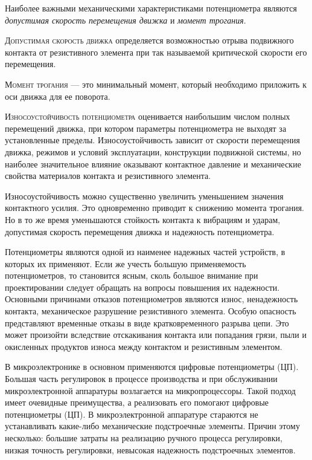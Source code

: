 Наиболее важными механическими характеристиками потенциометра являются \textit{допустимая скорость перемещения движка} и \textit{момент трогания}. 

\textsc{Допустимая скорость движка} определяется возможностью отрыва подвижного контакта от резистивного элемента при так называемой критической скорости его перемещения.

\textsc{Момент трогания} --- это минимальный момент, который необходимо приложить к оси движка для ее поворота. 

\textsc{Износоустойчивость потенциометра} оценивается наибольшим числом полных перемещений движка, при котором параметры потенциометра не выходят за установленные пределы. Износоустойчивость зависит от скорости перемещения движка, режимов и условий эксплуатации, конструкции подвижной системы, но наиболее значительное влияние оказывают контактное давление и механические свойства материалов контакта и резистивного элемента. 

Износоустойчивость можно существенно увеличить уменьшением значения контактного усилия. 
Это одновременно приводит к снижению момента трогания. Но в то же время уменьшаются стойкость контакта к вибрациям и ударам, допустимая скорость перемещения движка и надежность потенциометра. 

Потенциометры являются одной из наименее надежных частей устройств, в которых их применяют. 
Если же учесть большую применяемость потенциометров, то становится ясным, сколь большое внимание при проектировании следует обращать на вопросы повышения их надежности. 
Основными причинами отказов потенциометров являются износ, ненадежность контакта, механическое разрушение резистивного элемента. 
Особую опасность представляют временные отказы в виде кратковременного разрыва цепи. 
Это может произойти вследствие отскакивания контакта или попадания грязи, пыли и окисленных продуктов износа между контактом и резистивным элементом. 

В микроэлектронике в основном применяются цифровые потенциометры (ЦП). 
Большая часть регулировок в процессе производства и при обслуживании микроэлектронной аппаратуры возлагается на микропроцессоры. 
Такой подход имеет очевидные преимущества, а реализовать его помогают цифровые потенциометры (ЦП). 
В микроэлектронной аппаратуре стараются не устанавливать какие-либо механические подстроечные элементы.  
Причин этому несколько: большие затраты на реализацию ручного процесса регулировки, низкая точность регулировки, невысокая надежность подстроечных элементов. 

